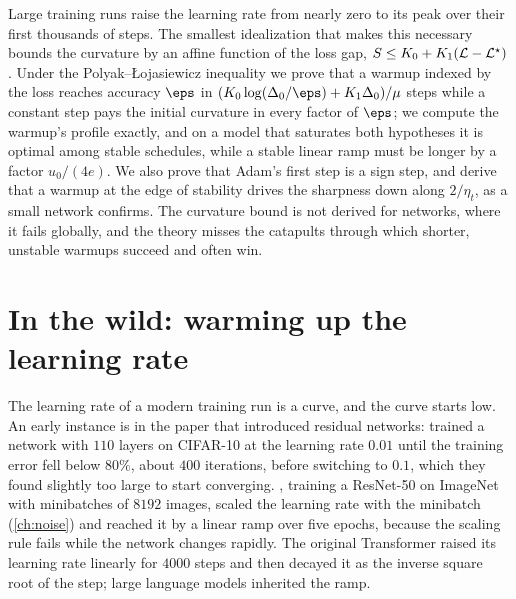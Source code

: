 
\begin{refsection}

\begin{chaptersummary}
Large training runs raise the learning rate from nearly zero to its peak over their first thousands of steps. The smallest idealization that makes this necessary bounds the curvature by an affine function of the loss gap, $S\le K_0+K_1(\mathcal{L}-\mathcal{L}^\star)$. Under the Polyak--Łojasiewicz inequality we prove that a warmup indexed by the loss reaches accuracy $\eps$ in $(K_0\log(\Delta_0/\eps)+K_1\Delta_0)/\mu$ steps while a constant step pays the initial curvature in every factor of $\eps$; we compute the warmup's profile exactly, and on a model that saturates both hypotheses it is optimal among stable schedules, while a stable linear ramp must be longer by a factor $u_0/(4e)$. We also prove that Adam's first step is a sign step, and derive that a warmup at the edge of stability drives the sharpness down along $2/\eta_t$, as a small network confirms. The curvature bound is not derived for networks, where it fails globally, and the theory misses the catapults through which shorter, unstable warmups succeed and often win.
\end{chaptersummary}

\section{In the wild: warming up the learning rate}\label{sec:warmup:wild}

The learning rate of a modern training run is a curve, and the curve starts low. An early instance is in the paper that introduced residual networks: \textcite{HeEtAl2016} trained a network with $110$ layers on CIFAR-10 at the learning rate $0.01$ until the training error fell below $80\%$, about $400$ iterations, before switching to $0.1$, which they found slightly too large to start converging. \Textcite{GoyalEtAl2017}, training a ResNet-50 on ImageNet with minibatches of $8192$ images, scaled the learning rate with the minibatch (\cref{ch:noise}) and reached it by a linear ramp over five epochs, because the scaling rule fails while the network changes rapidly. The original Transformer \parencite{VaswaniEtAl2017} raised its learning rate linearly for $4000$ steps and then decayed it as the inverse square root of the step; large language models inherited the ramp.


\end{refsection}
